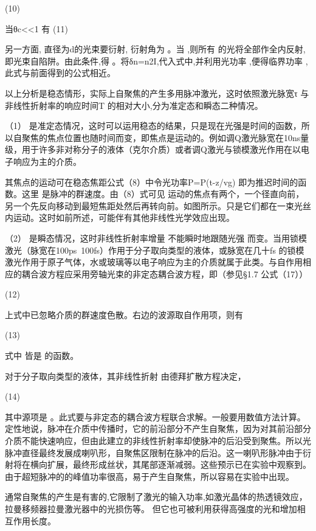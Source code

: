                                                      (10)
                                                     
当θc<<1 有                        (11)

另一方面, 直径为d的光束要衍射, 衍射角为 。当 ,则所有 的光将全部作全内反射,即光束自陷阱。由此条件,得 。将δn=n2I,代入式中,并利用光功率 ,便得临界功率 ,此式与前面得到的公式相近。

以上分析是稳态情形，实际上自聚焦的产生多用脉冲激光，这时依照激光脉宽τ 与非线性折射率的响应时间T 的相对大小,分为准定态和瞬态二种情况。

（1） 是准定态情况，这时可以运用稳态的结果，只是现在光强是时间的函数，所以自聚焦的焦点位置也随时间而变，即焦点是运动的。例如调Q激光脉宽在10ns量级，用于许多非对称分子的液体（克尔介质）或者调Q激光与锁模激光作用在以电子响应为主的介质。

其焦点的运动可在稳态焦距公式（8）中令光功率P=P(t-z/vg) 即为推迟时间的函数。这里 是脉冲的群速度。由（8）式可见 运动的焦点有两个，一个径直向前，另一个先反向移动到最短焦距处然后再转向前。如图所示。只是它们都在一束光丝内运动。这时如前所述，可能伴有其他非线性光学效应出现。
       
（2） 是瞬态情况，这时非线性折射率增量  不能瞬时地跟随光强 而变。当用锁模激光（脉宽在100ps~100fs）作用于分子取向类型的液体，或脉宽在几十fs 的锁模激光作用于原子气体，水或玻璃等以电子响应为主的介质就属于此类。与自作用相应的耦合波方程应采用旁轴光束的非定态耦合波方程，即（参见§1.7 公式（17））

                   (12)

上式中已忽略介质的群速度色散。右边的波源取自作用项，则有

                          (13)

式中 皆是 的函数。

对于分子取向类型的液体，其非线性折射  由德拜扩散方程决定， 

                                      (14)
                                      
其中源项是 。此式要与非定态的耦合波方程联合求解。一般要用数值方法计算。定性地说，脉冲在介质中传播时，它的前沿部分不产生自聚焦，因为对其前沿部分介质不能快速响应，但由此建立的非线性折射率却使脉冲的后沿受到聚焦。所以光脉冲直径最终发展成喇叭形，自聚焦区限制在脉冲的后沿。这一喇叭形脉冲由于衍射将在横向扩展，最终形成丝状，其尾部逐渐减弱。这些预示已在实验中观察到。由于超短脉冲的的峰值功率很高，易于产生自聚焦，所以容易在实验中出现。

通常自聚焦的产生是有害的,它限制了激光的输入功率,如激光晶体的热透镜效应，拉曼移频器拉曼激光器中的光损伤等。 但它也可被利用获得高强度的光和增加相互作用长度。

